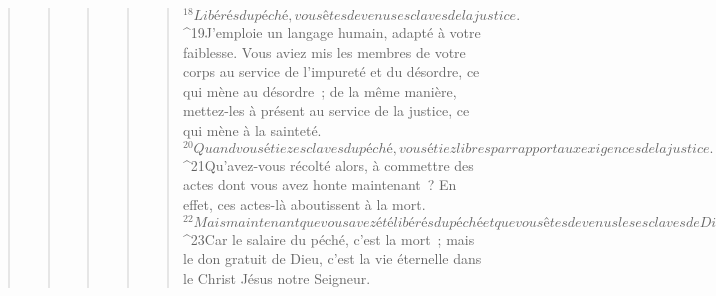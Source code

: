 \begin{verse}
\begin{verse}
\begin{verse}
\begin{verse}
\begin{verse}
${}^{18}Libérés du péché, vous êtes devenus esclaves de la justice.
${}^{19}J’emploie un langage humain, adapté à votre faiblesse. Vous aviez mis les membres de votre corps au service de l’impureté et du désordre, ce qui mène au désordre ; de la même manière, mettez-les à présent au service de la justice, ce qui mène à la sainteté. 
${}^{20}Quand vous étiez esclaves du péché, vous étiez libres par rapport aux exigences de la justice. 
${}^{21}Qu’avez-vous récolté alors, à commettre des actes dont vous avez honte maintenant ? En effet, ces actes-là aboutissent à la mort. 
${}^{22}Mais maintenant que vous avez été libérés du péché et que vous êtes devenus les esclaves de Dieu, vous récoltez ce qui mène à la sainteté, et cela aboutit à la vie éternelle. 
${}^{23}Car le salaire du péché, c’est la mort ; mais le don gratuit de Dieu, c’est la vie éternelle dans le Christ Jésus notre Seigneur.
      

\end{verse}
\end{verse}
\end{verse}
\end{verse}
\end{verse}
